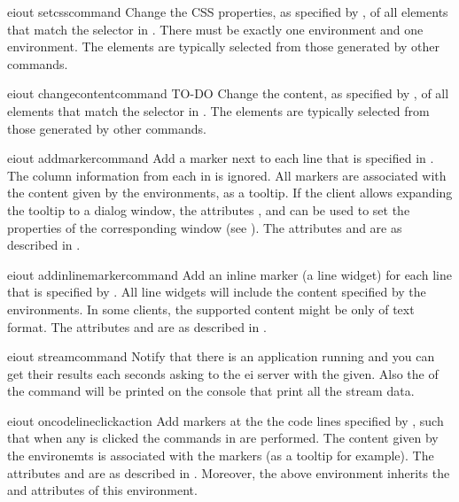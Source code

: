 \bigskip
\xmlstruct
{eiout}
{setcsscommand}
{%
%
  Change the CSS properties, as specified by
  , of all elements that match the
  selector in .
%
  There must be exactly one  environment and
  one  environment. 
%
  The elements are typically selected from those generated by other
  commands.
%
}


\bigskip
\xmlstruct
{eiout}
{changecontentcommand}
{%
% 
  TO-DO
%
  Change the content, as specified by
  , of all elements that match the
  selector in .
%
  The elements are typically selected from those generated by other
  commands.
%
}

\bigskip
\xmlstruct
{eiout}
{addmarkercommand}
{%
%
  Add a marker next to each line that is specified in
  . The column information from each
   in  is
  ignored.  All markers are associated with the content given by the
   environments, as a tooltip. If the
  client allows expanding the tooltip to a dialog window, the
  attributes ,  and
   can be used to set the properties of the
  corresponding window (see ).
%
  The attributes  and  are
  as described in .
%
}

\bigskip
\xmlstruct
{eiout}
{addinlinemarkercommand}
{%
%
  Add an inline marker (a line widget) for each line that is specified
  by . All line widgets will include the content
  specified by the  environments. In some
  clients, the supported content might be only of text format.
%
  The attributes  and  are
  as described in .
%
}

\bigskip
\xmlstruct
{eiout}
{streamcommand}
{%
%
  Notify that there is an application running and you can get their
  results each  seconds asking to the ei server
  with the  given.
  Also the  of the command will be
  printed on the console  that print all the
  stream data. 
%
}


\bigskip
\xmlstruct
{eiout}
{oncodelineclickaction}
{%
%
  Add markers at the the code lines specified by ,
  such that when any is clicked the commands in
   are performed.
  The content given by the  environemts is
  associated with the markers (as a tooltip for example).
%
  The attributes  and  are
  as described in . Moreover, the above
   environment inherits the
   and  attributes of this
  environment.
%
}


